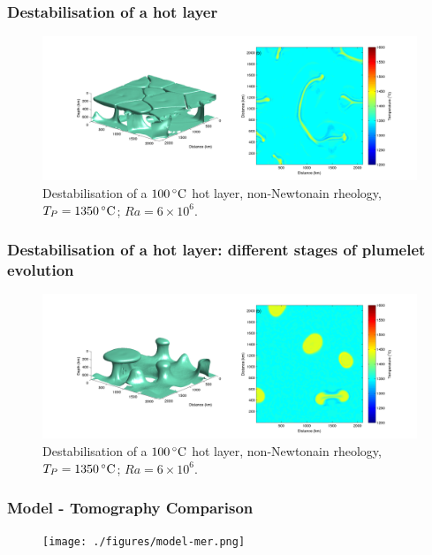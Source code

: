 \documentclass[aspectratio=169]{beamer}
\begin{document}
\begin{frame}
    \frametitle{Destabilisation of a hot layer}
    \begin{figure}
        \vspace{-.5cm}
        \includegraphics[width=0.85\paperwidth]{./figures/100hot/100hotbase_7.png}
        \caption{Destabilisation of a $100\rm\,^{\circ}C$ hot layer, non-Newtonain rheology, $T_{P}=1350\rm\,^{\circ}C$; $Ra = 6\times10^{6}$.}
    \end{figure}
\end{frame}

\begin{frame}
    \frametitle{Destabilisation of a hot layer: different stages of plumelet evolution}
    \begin{figure}
        \vspace{-.5cm}
        \includegraphics[width=0.85\paperwidth]{./figures/100hot/100hotbase_3.png}
        \caption{Destabilisation of a $100\rm\,^{\circ}C$ hot layer, non-Newtonain rheology, $T_{P}=1350\rm\,^{\circ}C$; $Ra = 6\times10^{6}$.}
    \end{figure}
\end{frame}

\begin{frame}
    \frametitle{Model - Tomography Comparison}
    \begin{figure}
        \vspace{-0.5cm}
        \texttt{[image: ./figures/model-mer.png]}
    \end{figure}
\end{frame}
\end{document}
